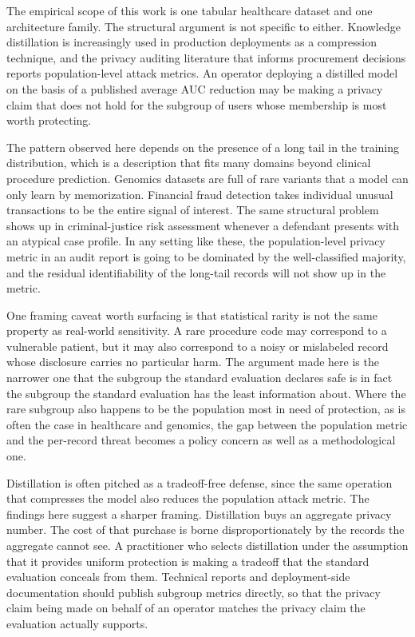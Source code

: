 \documentclass[conference]{IEEEtran}
\begin{document}
The empirical scope of this work is one tabular healthcare dataset and one architecture family. The structural argument is not specific to either. Knowledge distillation is increasingly used in production deployments as a compression technique, and the privacy auditing literature that informs procurement decisions reports population-level attack metrics. An operator deploying a distilled model on the basis of a published average AUC reduction may be making a privacy claim that does not hold for the subgroup of users whose membership is most worth protecting.

The pattern observed here depends on the presence of a long tail in the training distribution, which is a description that fits many domains beyond clinical procedure prediction. Genomics datasets are full of rare variants that a model can only learn by memorization. Financial fraud detection takes individual unusual transactions to be the entire signal of interest. The same structural problem shows up in criminal-justice risk assessment whenever a defendant presents with an atypical case profile. In any setting like these, the population-level privacy metric in an audit report is going to be dominated by the well-classified majority, and the residual identifiability of the long-tail records will not show up in the metric.

One framing caveat worth surfacing is that statistical rarity is not the same property as real-world sensitivity. A rare procedure code may correspond to a vulnerable patient, but it may also correspond to a noisy or mislabeled record whose disclosure carries no particular harm. The argument made here is the narrower one that the subgroup the standard evaluation declares safe is in fact the subgroup the standard evaluation has the least information about. Where the rare subgroup also happens to be the population most in need of protection, as is often the case in healthcare and genomics, the gap between the population metric and the per-record threat becomes a policy concern as well as a methodological one.

Distillation is often pitched as a tradeoff-free defense, since the same operation that compresses the model also reduces the population attack metric. The findings here suggest a sharper framing. Distillation buys an aggregate privacy number. The cost of that purchase is borne disproportionately by the records the aggregate cannot see. A practitioner who selects distillation under the assumption that it provides uniform protection is making a tradeoff that the standard evaluation conceals from them. Technical reports and deployment-side documentation should publish subgroup metrics directly, so that the privacy claim being made on behalf of an operator matches the privacy claim the evaluation actually supports.
\end{document}
